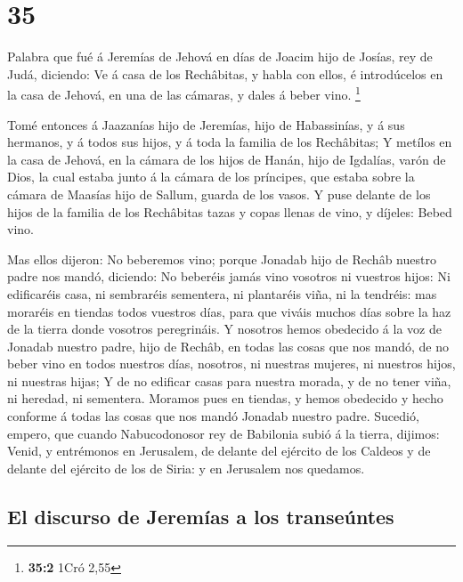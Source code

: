 \hypertarget{section-34}{%
\section{35}\label{section-34}}

 Palabra que fué á Jeremías de Jehová en días de Joacim hijo
de Josías, rey de Judá, diciendo:  Ve á casa de los
Rechâbitas, y habla con ellos, é introdúcelos en la casa de Jehová, en
una de las cámaras, y dales á beber vino. \footnote{\textbf{35:2} 1Cró
  2,55}

 Tomé entonces á Jaazanías hijo de Jeremías, hijo de
Habassinías, y á sus hermanos, y á todos sus hijos, y á toda la familia
de los Rechâbitas;  Y metílos en la casa de Jehová, en la
cámara de los hijos de Hanán, hijo de Igdalías, varón de Dios, la cual
estaba junto á la cámara de los príncipes, que estaba sobre la cámara de
Maasías hijo de Sallum, guarda de los vasos.  Y puse delante
de los hijos de la familia de los Rechâbitas tazas y copas llenas de
vino, y díjeles: Bebed vino.

 Mas ellos dijeron: No beberemos vino; porque Jonadab hijo
de Rechâb nuestro padre nos mandó, diciendo: No beberéis jamás vino
vosotros ni vuestros hijos:  Ni edificaréis casa, ni
sembraréis sementera, ni plantaréis viña, ni la tendréis: mas moraréis
en tiendas todos vuestros días, para que viváis muchos días sobre la haz
de la tierra donde vosotros peregrináis.  Y nosotros hemos
obedecido á la voz de Jonadab nuestro padre, hijo de Rechâb, en todas
las cosas que nos mandó, de no beber vino en todos nuestros días,
nosotros, ni nuestras mujeres, ni nuestros hijos, ni nuestras hijas;
 Y de no edificar casas para nuestra morada, y de no tener
viña, ni heredad, ni sementera.  Moramos pues en tiendas, y
hemos obedecido y hecho conforme á todas las cosas que nos mandó Jonadab
nuestro padre.  Sucedió, empero, que cuando Nabucodonosor
rey de Babilonia subió á la tierra, dijimos: Venid, y entrémonos en
Jerusalem, de delante del ejército de los Caldeos y de delante del
ejército de los de Siria: y en Jerusalem nos quedamos.

\hypertarget{el-discurso-de-jeremuxedas-a-los-transeuxfantes}{%
\subsection{El discurso de Jeremías a los
transeúntes}\label{el-discurso-de-jeremuxedas-a-los-transeuxfantes}}

